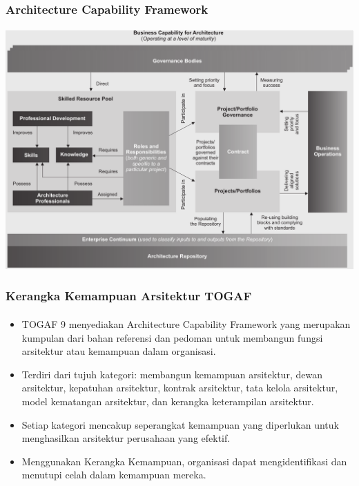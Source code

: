 \documentclass[aspectratio=169, table]{beamer}
\begin{document}
	{
		\begin{frame}
			\frametitle{Architecture Capability Framework}
			\framesubtitle{\hspace{1cm}}
			\begin{center}
				\includegraphics[width=.80\textwidth]{../figures/architecture_capability_framework}
			\end{center}
		\end{frame}
	}

	\begin{frame}
		\frametitle{Kerangka Kemampuan Arsitektur TOGAF}
		\framesubtitle{\hspace{1cm}}
		\begin{itemize}
			\item TOGAF 9 menyediakan Architecture Capability Framework yang merupakan kumpulan dari bahan referensi dan pedoman untuk membangun fungsi arsitektur
			atau kemampuan dalam organisasi.
			\item Terdiri dari tujuh kategori: membangun kemampuan arsitektur, dewan arsitektur, kepatuhan arsitektur, kontrak arsitektur, tata kelola arsitektur, model kematangan arsitektur, dan kerangka keterampilan arsitektur.
			\item Setiap kategori mencakup seperangkat kemampuan yang diperlukan untuk menghasilkan arsitektur perusahaan yang efektif.
			\item Menggunakan Kerangka Kemampuan, organisasi dapat mengidentifikasi dan menutupi celah dalam kemampuan mereka.
		\end{itemize}
	\end{frame}
\end{document}
